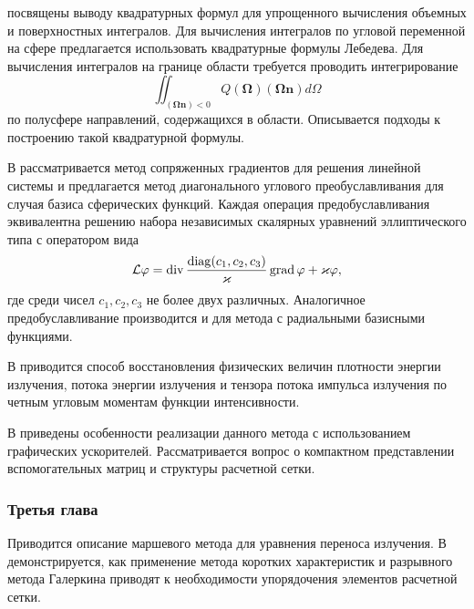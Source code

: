  посвящены выводу квадратурных формул для упрощенного вычисления объемных и поверхностных интегралов. Для вычисления интегралов по угловой переменной на сфере предлагается использовать квадратурные формулы Лебедева. Для вычисления интегралов на границе области требуется проводить интегрирование
\[
\iint_{(\boldsymbol \Omega \mathbf n) < 0}  Q(\boldsymbol \Omega) (\boldsymbol \Omega \mathbf n) d\Omega
\]
по полусфере направлений, содержащихся в области. Описывается подходы к построению такой квадратурной формулы. 

В  рассматривается метод сопряженных градиентов для решения линейной системы и предлагается метод диагонального углового преобуславливания для случая базиса сферических функций. Каждая операция предобуславливания эквивалентна решению набора независимых скалярных уравнений эллиптического типа с оператором вида
\[
\mathcal{L}\varphi = \operatorname{div} \frac{\operatorname{diag}(c_1, c_2, c_3)}{\varkappa}\operatorname{grad} \varphi + \varkappa \varphi,
\]
где среди чисел $c_1, c_2, c_3$ не более двух различных. Аналогичное предобуславливание производится и для метода с радиальными базисными функциями.

В  приводится способ восстановления физических величин плотности энергии излучения, потока энергии излучения и тензора потока импульса излучения по четным угловым моментам функции интенсивности.

В  приведены особенности реализации данного метода с использованием графических ускорителей. Рассматривается вопрос о компактном представлении вспомогательных матриц и структуры расчетной сетки.


\subsubsection*{Третья глава}
Приводится описание маршевого метода для уравнения переноса излучения. В  демонстрируется, как применение метода коротких характеристик и разрывного метода Галеркина приводят к необходимости упорядочения элементов расчетной сетки.

